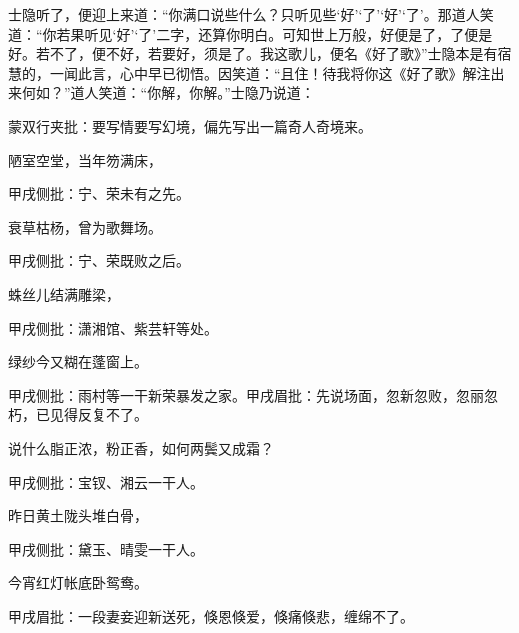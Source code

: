\begin{parag}
    士隐听了，便迎上来道：“你满口说些什么？只听见些‘好’‘了’‘好’‘了’。那道人笑道：“你若果听见‘好’‘了’二字，还算你明白。可知世上万般，好便是了，了便是好。若不了，便不好，若要好，须是了。我这歌儿，便名《好了歌》”士隐本是有宿慧的，一闻此言，心中早已彻悟。因笑道：“且住！待我将你这《好了歌》解注出来何如？”道人笑道：“你解，你解。”士隐乃说道：\begin{note}蒙双行夹批：要写情要写幻境，偏先写出一篇奇人奇境来。\end{note}
\end{parag}


\begin{poem}
    \begin{pl}陋室空堂，当年笏满床，\end{pl}\begin{note}甲戌侧批：宁、荣未有之先。\end{note}

    \begin{pl}衰草枯杨，曾为歌舞场。\end{pl}\begin{note}甲戌侧批：宁、荣既败之后。\end{note}

    \begin{pl}蛛丝儿结满雕梁，\end{pl}\begin{note}甲戌侧批：潇湘馆、紫芸轩等处。\end{note}

    \begin{pl}绿纱今又糊在蓬窗上。\end{pl}\begin{note}甲戌侧批：雨村等一干新荣暴发之家。甲戌眉批：先说场面，忽新忽败，忽丽忽朽，已见得反复不了。\end{note}

    \begin{pl}说什么脂正浓，粉正香，如何两鬓又成霜？\end{pl}\begin{note}甲戌侧批：宝钗、湘云一干人。\end{note}

    \begin{pl}昨日黄土陇头堆白骨，\end{pl}\begin{note}甲戌侧批：黛玉、晴雯一干人。\end{note}

    \begin{pl}今宵红灯帐底卧鸳鸯。\end{pl}\begin{note}甲戌眉批：一段妻妾迎新送死，倏恩倏爱，倏痛倏悲，缠绵不了。\end{note}


\end{poem}
